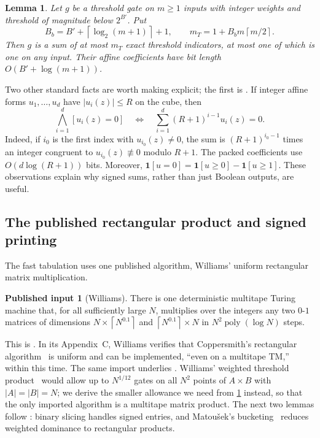 \documentclass[11pt,letterpaper]{article}
\newtheorem{lemma}[theorem]{Lemma}
\theoremstyle{definition}
\newtheorem{import}[theorem]{Published input}
\theoremstyle{remark}
\newcommand{\poly}{\operatorname{poly}}
\newcommand{\ind}{\mathbf 1}
\newcommand{\ceil}[1]{\left\lceil #1\right\rceil}
\newcommand{\abs}[1]{\left|#1\right|}
\newcommand{\lgx}{\log_2}
\begin{document}
\begin{lemma}\label{lem:exact}
Let \(g\) be a threshold gate on \(m\ge1\) inputs with integer weights
and threshold of magnitude below \(2^{B'}\). Put
\[
 B_b=B'+\ceil{\lgx(m+1)}+1,\qquad
 m_T=1+B_bm\ceil{m/2}.
\]
Then \(g\) is a sum of at most \(m_T\) exact threshold indicators,
at most one of which is one on any input. Their affine coefficients
have bit length \(O(B'+\log(m+1))\).
\end{lemma}

Two other standard facts are worth making explicit; the first is
\cite[Proposition~18(5)]{CW19}.
If integer affine forms \(u_1,\ldots,u_d\) have
\(\abs{u_i(z)}\le R\) on the cube, then
\[
 \bigwedge_{i=1}^d[u_i(z)=0]
 \quad\Longleftrightarrow\quad
 \sum_{i=1}^d(R+1)^{i-1}u_i(z)=0.                 \tag{*}\label{eq:pack}
\]
Indeed, if \(i_0\) is the first index with \(u_{i_0}(z)\ne0\), the sum
is \((R+1)^{i_0-1}\) times an integer congruent to
\(u_{i_0}(z)\not\equiv0\) modulo \(R+1\).
The packed coefficients use \(O(d\log(R+1))\) bits. Moreover,
\(\ind[u=0]=\ind[u\ge0]-\ind[u\ge1]\).
These observations explain why signed sums, rather than just Boolean
outputs, are useful.

\subsection{The published rectangular product and signed printing}

The fast tabulation uses one published algorithm, Williams' uniform
rectangular matrix multiplication.

\begin{import}[Williams]\label{imp:batch}
There is one deterministic multitape Turing machine that, for all
sufficiently large \(N\), multiplies over the integers any two
\(0\)-\(1\) matrices of dimensions \(N\times\ceil{N^{0.1}}\) and
\(\ceil{N^{0.1}}\times N\) in \(N^2\poly(\log N)\) steps.
\end{import}

This is \cite[Corollary~4.4, restated as Corollary~C.2]{WilACC14}. In
its Appendix~C, Williams verifies that Coppersmith's rectangular
algorithm~\cite{Cop82} is uniform and can be implemented, ``even on a
multitape TM,'' within this time. The same import underlies
\cite[Appendix~B]{NagCubic}. Williams' weighted threshold
product~\cite[Theorem~3.1]{Wil14} would allow up to \(N^{1/12}\) gates
on all \(N^2\) points of \(A\times B\) with \(\abs A=\abs B=N\); we derive the smaller allowance we need from \cref{imp:batch}
instead, so that the only imported algorithm is a multitape matrix
product. The next two lemmas follow \cite[Appendix~B]{NagCubic}: binary
slicing handles signed entries, and Matou\v{s}ek's bucketing~\cite{Mat91}
reduces weighted dominance to rectangular products.
\end{document}
